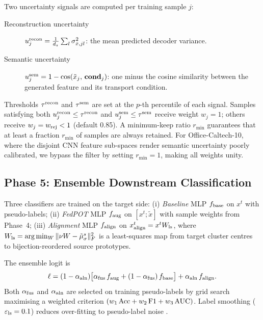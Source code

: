 \documentclass[a4paper,fleqn]{cas-sc}
\begin{document}
Two uncertainty signals are computed per training sample $j$:
\begin{description}
  \item[Reconstruction uncertainty]
    $u_j^{\rm recon} = \frac{1}{d_s}\sum_l \sigma_{\hat x,jl}^2$:
    the mean predicted decoder variance.
  \item[Semantic uncertainty]
    $u_j^{\rm sem} = 1 - \cos(\tilde x_j,\,\mathbf{cond}_j)$:
    one minus the cosine similarity between the generated feature
    and its transport condition.
\end{description}
Thresholds $\tau^{\rm recon}$ and $\tau^{\rm sem}$ are set at the
$p$-th percentile of each signal.
Samples satisfying both $u_j^{\rm recon}\leq\tau^{\rm recon}$ and
$u_j^{\rm sem}\leq\tau^{\rm sem}$ receive weight $w_j=1$; others
receive $w_j = w_{\rm rej} < 1$ (default 0.85).
A minimum-keep ratio $r_{\min}$ guarantees that at least a fraction
$r_{\min}$ of samples are always retained.
For Office-Caltech-10, where the disjoint CNN feature sub-spaces render
semantic uncertainty poorly calibrated, we bypass the filter by setting
$r_{\min}=1$, making all weights unity.

\subsection{Phase 5: Ensemble Downstream Classification}
\label{sec:phase5}

Three classifiers are trained on the target side:
(i) \emph{Baseline} MLP $f_{\rm base}$ on $x^t$ with pseudo-labels;
(ii) \emph{FedPOT} MLP $f_{\rm aug}$ on $[x^t;\tilde x]$ with
     sample weights from Phase~4;
(iii) \emph{Alignment} MLP $f_{\rm align}$ on
     $x^t_{\rm align} = x^t W_{\rm ls}$, where
     $W_{\rm ls}=\arg\min_W \|\nu W - \tilde\mu^s_\sigma\|_F^2$
     is a least-squares map from target cluster centres to
     bijection-reordered source prototypes.

The ensemble logit is
\begin{equation}
  \ell = (1-\alpha_{\rm aln})\bigl[
    \alpha_{\rm fus}\,f_{\rm aug} + (1-\alpha_{\rm fus})\,f_{\rm base}
  \bigr]
  + \alpha_{\rm aln}\,f_{\rm align}.
  \label{eq:ens}
\end{equation}
Both $\alpha_{\rm fus}$ and $\alpha_{\rm aln}$ are selected on training
pseudo-labels by grid search maximising a weighted criterion
$(w_1\,{\rm Acc} + w_2\,{\rm F1} + w_3\,{\rm AUC})$.
Label smoothing ($\varepsilon_{\rm ls}=0.1$) reduces over-fitting to
pseudo-label noise \citep{Li2020FedProx}.
\end{document}
